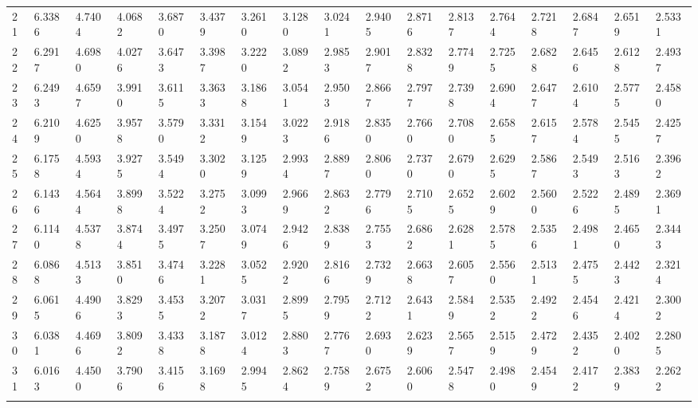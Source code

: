 {\begin{tabular}{|m{8pt}|m{18pt}*{15}{m{18pt}}}
 21 & 6.3386 & 4.7404 & 4.0682 & 3.6870 & 3.4379 & 3.2610 & 3.1280 & 3.0241 & 2.9405 & 2.8716 & 2.8137 & 2.7644 & 2.7218 & 2.6847 & 2.6519 & 2.5331 \\[2pt] \arrayrulecolor{light-gray}\hline\arrayrulecolor{black}  
 22 & 6.2917 & 4.6980 & 4.0276 & 3.6473 & 3.3987 & 3.2220 & 3.0892 & 2.9853 & 2.9017 & 2.8328 & 2.7749 & 2.7255 & 2.6828 & 2.6456 & 2.6128 & 2.4937 \\[2pt] \arrayrulecolor{light-gray}\hline\arrayrulecolor{black}  
 23 & 6.2493 & 4.6597 & 3.9910 & 3.6115 & 3.3633 & 3.1868 & 3.0541 & 2.9503 & 2.8667 & 2.7977 & 2.7398 & 2.6904 & 2.6477 & 2.6104 & 2.5775 & 2.4580 \\[2pt] \arrayrulecolor{light-gray}\hline\arrayrulecolor{black}  
 24 & 6.2109 & 4.6250 & 3.9578 & 3.5790 & 3.3312 & 3.1549 & 3.0223 & 2.9186 & 2.8350 & 2.7660 & 2.7080 & 2.6585 & 2.6157 & 2.5784 & 2.5455 & 2.4257 \\[2pt] \arrayrulecolor{light-gray}\hline\arrayrulecolor{black}  
 25 & 6.1758 & 4.5934 & 3.9275 & 3.5494 & 3.3020 & 3.1259 & 2.9934 & 2.8897 & 2.8060 & 2.7370 & 2.6790 & 2.6295 & 2.5867 & 2.5493 & 2.5163 & 2.3962 \\[2pt] \arrayrulecolor{light-gray}\hline\arrayrulecolor{black}  
 26 & 6.1436 & 4.5644 & 3.8998 & 3.5224 & 3.2752 & 3.0993 & 2.9669 & 2.8632 & 2.7796 & 2.7105 & 2.6525 & 2.6029 & 2.5600 & 2.5226 & 2.4895 & 2.3691 \\[2pt] \arrayrulecolor{light-gray}\hline\arrayrulecolor{black}  
 27 & 6.1140 & 4.5378 & 3.8744 & 3.4975 & 3.2507 & 3.0749 & 2.9426 & 2.8389 & 2.7553 & 2.6862 & 2.6281 & 2.5785 & 2.5356 & 2.4981 & 2.4650 & 2.3443 \\[2pt] \arrayrulecolor{light-gray}\hline\arrayrulecolor{black}  
 28 & 6.0868 & 4.5133 & 3.8510 & 3.4746 & 3.2281 & 3.0525 & 2.9202 & 2.8166 & 2.7329 & 2.6638 & 2.6057 & 2.5560 & 2.5131 & 2.4755 & 2.4423 & 2.3214 \\[2pt] \arrayrulecolor{light-gray}\hline\arrayrulecolor{black}  
 29 & 6.0615 & 4.4906 & 3.8293 & 3.4535 & 3.2072 & 3.0317 & 2.8995 & 2.7959 & 2.7122 & 2.6431 & 2.5849 & 2.5352 & 2.4922 & 2.4546 & 2.4214 & 2.3002 \\[2pt] \arrayrulecolor{light-gray}\hline\arrayrulecolor{black}  
 30 & 6.0381 & 4.4696 & 3.8092 & 3.4338 & 3.1878 & 3.0124 & 2.8803 & 2.7767 & 2.6930 & 2.6239 & 2.5657 & 2.5159 & 2.4729 & 2.4352 & 2.4020 & 2.2805 \\[2pt] \arrayrulecolor{light-gray}\hline\arrayrulecolor{black}  
 31 & 6.0163 & 4.4500 & 3.7906 & 3.4156 & 3.1698 & 2.9945 & 2.8624 & 2.7589 & 2.6752 & 2.6060 & 2.5478 & 2.4980 & 2.4549 & 2.4172 & 2.3839 & 2.2622 \\[2pt] \arrayrulecolor{light-gray}\hline\arrayrulecolor{black}  

\end{tabular}}
